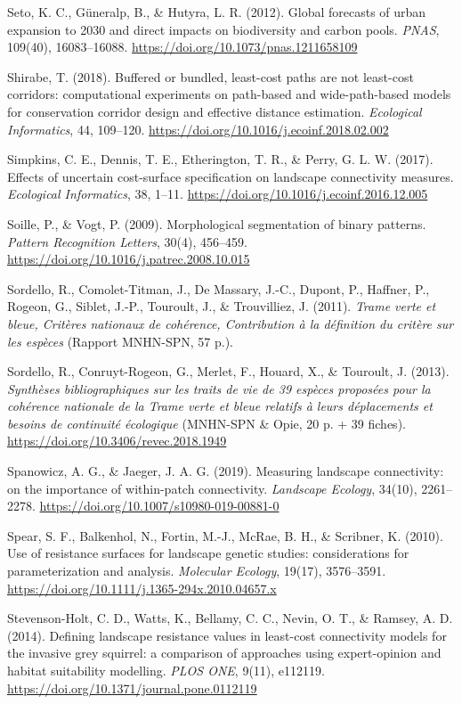 \documentclass[a4paper,11pt]{report}
\begin{document}
Seto, K. C., Güneralp, B., \& Hutyra, L. R. (2012). Global forecasts of urban expansion to 2030 and direct impacts on biodiversity and carbon pools. \textit{PNAS}, 109(40), 16083--16088. \url{https://doi.org/10.1073/pnas.1211658109}

Shirabe, T. (2018). Buffered or bundled, least-cost paths are not least-cost corridors: computational experiments on path-based and wide-path-based models for conservation corridor design and effective distance estimation. \textit{Ecological Informatics}, 44, 109--120. \url{https://doi.org/10.1016/j.ecoinf.2018.02.002}

Simpkins, C. E., Dennis, T. E., Etherington, T. R., \& Perry, G. L. W. (2017). Effects of uncertain cost-surface specification on landscape connectivity measures. \textit{Ecological Informatics}, 38, 1--11. \url{https://doi.org/10.1016/j.ecoinf.2016.12.005}

Soille, P., \& Vogt, P. (2009). Morphological segmentation of binary patterns. \textit{Pattern Recognition Letters}, 30(4), 456--459. \url{https://doi.org/10.1016/j.patrec.2008.10.015}

Sordello, R., Comolet-Titman, J., De Massary, J.-C., Dupont, P., Haffner, P., Rogeon, G., Siblet, J.-P., Touroult, J., \& Trouvilliez, J. (2011). \textit{Trame verte et bleue, Critères nationaux de cohérence, Contribution à la définition du critère sur les espèces} (Rapport MNHN-SPN, 57 p.).

Sordello, R., Conruyt-Rogeon, G., Merlet, F., Houard, X., \& Touroult, J. (2013). \textit{Synthèses bibliographiques sur les traits de vie de 39 espèces proposées pour la cohérence nationale de la Trame verte et bleue relatifs à leurs déplacements et besoins de continuité écologique} (MNHN-SPN \& Opie, 20 p. + 39 fiches). \url{https://doi.org/10.3406/revec.2018.1949}

Spanowicz, A. G., \& Jaeger, J. A. G. (2019). Measuring landscape connectivity: on the importance of within-patch connectivity. \textit{Landscape Ecology}, 34(10), 2261--2278. \url{https://doi.org/10.1007/s10980-019-00881-0}

Spear, S. F., Balkenhol, N., Fortin, M.-J., McRae, B. H., \& Scribner, K. (2010). Use of resistance surfaces for landscape genetic studies: considerations for parameterization and analysis. \textit{Molecular Ecology}, 19(17), 3576--3591. \url{https://doi.org/10.1111/j.1365-294x.2010.04657.x}

Stevenson-Holt, C. D., Watts, K., Bellamy, C. C., Nevin, O. T., \& Ramsey, A. D. (2014). Defining landscape resistance values in least-cost connectivity models for the invasive grey squirrel: a comparison of approaches using expert-opinion and habitat suitability modelling. \textit{PLOS ONE}, 9(11), e112119. \url{https://doi.org/10.1371/journal.pone.0112119}
\end{document}
